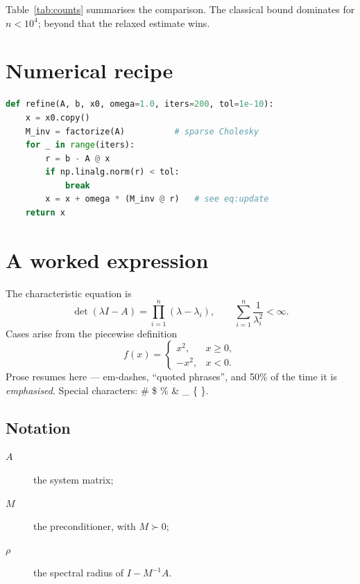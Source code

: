 \documentclass[11pt]{article}
\begin{document}
Table~\ref{tab:counts} summarises the comparison. The classical bound
dominates for $n < 10^{4}$; beyond that the relaxed estimate wins.

\section{Numerical recipe}

\begin{lstlisting}[language=Python]
def refine(A, b, x0, omega=1.0, iters=200, tol=1e-10):
    x = x0.copy()
    M_inv = factorize(A)          # sparse Cholesky
    for _ in range(iters):
        r = b - A @ x
        if np.linalg.norm(r) < tol:
            break
        x = x + omega * (M_inv @ r)   # see eq:update
    return x
\end{lstlisting}

\section{A worked expression}

The characteristic equation is
\begin{equation}
  \det(\lambda I - A) = \prod_{i=1}^{n}(\lambda - \lambda_i),
  \qquad
  \sum_{i=1}^{n} \frac{1}{\lambda_i^2} < \infty .
\end{equation}
Cases arise from the piecewise definition
\[
  f(x) = \begin{cases}
    x^2,      & x \geq 0, \\
    -x^2,     & x < 0 .
  \end{cases}
\]
Prose resumes here --- em-dashes, ``quoted phrases'', and 50\% of the
time it is \emph{emphasised}. Special characters: \# \$ \% \& \_ \{ \}.

\subsection{Notation}\label{sec:notation}

\begin{description}
  \item[$A$] the system matrix;
  \item[$M$] the preconditioner, with $M \succ 0$;
  \item[$\rho$] the spectral radius of $I - M^{-1}A$.
\end{description}
\end{document}
